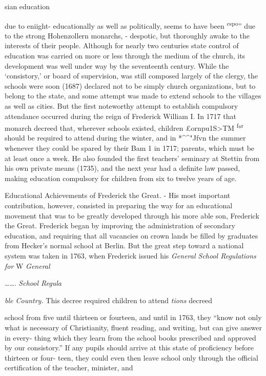 \documentclass[]{book}
\begin{document}
sian education

due to eniight- educationally as well as politically, seems to have been \textsuperscript{cspo}'' due to the strong Hohenzollern monarchs, - despotic, but thoroughly awake to the interests of their people. Although for nearly two centuries state control of education was carried on more or less through the medium of the church, its development was well under way by the seventeenth century. While the `consistory,' or board of supervision, was still composed largely of the clergy, the schools were soon (1687) declared not to be simply church organizations, but to belong to the state, and some attempt was made to extend schools to the villages as well as cities. But the first noteworthy attempt to establish compulsory attendance occurred during the reign of Frederick William I. In 1717 that monarch decreed that, wherever schools existed, children £ornpu1S\textgreater{}TM \textsuperscript{f}°\textsuperscript{r} should be required to attend during the winter, and in \textbar{}*\^{}\^{}"Jfvn the summer whenever they could be spared by their Bam 1 in 1717; parents, which must be at least once a week. He also founded the first teachers' seminary at Stettin from his own private means (1735), and the next year had a definite law passed, making education compulsory for children from six to twelve years of age.

Educational Achievements of Frederick the Great. - His most important contribution, however, consisted in preparing the way for an educational movement that was to be greatly developed through his more able son, Frederick the Great. Frederick began by improving the administration of secondary education, and requiring that all vacancies on crown lands be filled by graduates from Hecker's normal school at Berlin. But the great step toward a national system was taken in 1763, when Frederick issued his \emph{General School Regulations for} W \emph{General}

\ldots{}\ldots{}. \emph{School Regula}

\emph{ble Country.} This decree required children to attend \emph{tions} decreed

school from five until thirteen or fourteen, and until in 1763, they ``know not only what is necessary of Christianity, fluent reading, and writing, but can give answer in every- thing which they learn from the school books prescribed and approved by our consistory.'' If any pupils should arrive at this state of proficiency before thirteen or four- teen, they could even then leave school only through the official certification of the teacher, minister, and
\end{document}
